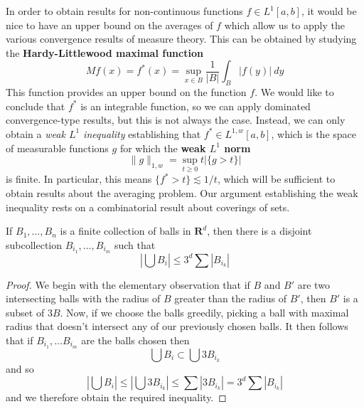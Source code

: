 In order to obtain results for non-continuous functions $f \in L^1[a,b]$, it would be nice to have an upper bound on the averages of $f$ which allow us to apply the various convergence results of measure theory. This can be obtained by studying the {\bf Hardy-Littlewood maximal function}
%
\[ Mf(x) = f^*(x) = \sup_{x \in B} \frac{1}{|B|} \int_B |f(y)|\ dy \]
%
This function provides an upper bound on the function $f$. We would like to conclude that $f^*$ is an integrable function, so we can apply dominated convergence-type results, but this is not always the case. Instead, we can only obtain a {\it weak $L^1$ inequality} establishing that $f^* \in L^{1,w}[a,b]$, which is the space of measurable functions $g$ for which the {\bf weak $L^1$ norm}
%
\[ \| g \|_{1,w} = \sup_{t \geq 0} t |\{ g > t \}| \]
%
is finite. In particular, this means $\{ f^* > t \} \lesssim 1/t$, which will be sufficient to obtain results about the averaging problem. Our argument establishing the weak inequality rests on a combinatorial result about coverings of sets.

\begin{lemma}
    If $B_1, \dots, B_n$ is a finite collection of balls in $\mathbf{R}^d$, then there is a disjoint subcollection $B_{i_1}, \dots, B_{i_m}$ such that
    \[ \left| \bigcup B_i \right| \leq 3^d \sum |B_{i_k}| \]
\end{lemma}
\begin{proof}
    We begin with the elementary observation that if $B$ and $B'$ are two intersecting balls with the radius of $B$ greater than the radius of $B'$, then $B'$ is a subset of $3B$. Now, if we choose the balls greedily, picking a ball with maximal radius that doesn't intersect any of our previously chosen balls. It then follows that if $B_{i_1}, \dots B_{i_m}$ are the balls chosen then
    \[ \bigcup B_i \subset \bigcup 3B_{i_k} \]
    and so
    \[ \left| \bigcup B_i \right| \leq \left| \bigcup 3B_{i_k} \right| \leq \sum |3B_{i_k}| = 3^d \sum |B_{i_k}| \]
    and we therefore obtain the required inequality.
\end{proof}

